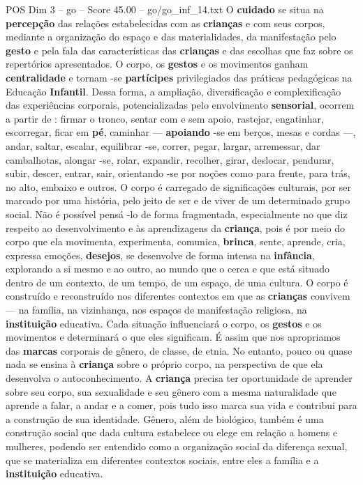 \begin{textsample}{POS Dim 3 – go – Score 45.00 – go/go\_inf\_14.txt}
O \textbf{cuidado} se situa na \textbf{percepção} das relações estabelecidas com as \textbf{crianças} e com seus corpos, mediante a organização do espaço e das materialidades, da manifestação pelo \textbf{gesto} e pela fala das características das \textbf{crianças} e das escolhas que faz sobre os repertórios apresentados.
O corpo, os \textbf{gestos} e os movimentos ganham \textbf{centralidade} e tornam -se \textbf{partícipes} privilegiados das práticas pedagógicas na Educação \textbf{Infantil}.
Dessa forma, a ampliação, diversificação e complexificação das experiências corporais, potencializadas pelo envolvimento \textbf{sensorial}, ocorrem a partir de : firmar o tronco, sentar com e sem apoio, rastejar, engatinhar, escorregar, ficar em \textbf{pé}, caminhar — \textbf{apoiando} -se em berços, mesas e cordas —, andar, saltar, escalar, equilibrar -se, correr, pegar, largar, arremessar, dar cambalhotas, alongar -se, rolar, expandir, recolher, girar, deslocar, pendurar, subir, descer, entrar, sair, orientando -se por noções como para frente, para trás, no alto, embaixo e outros.
O corpo é carregado de significações culturais, por ser marcado por uma história, pelo jeito de ser e de viver de um determinado grupo social.
Não é possível pensá -lo de forma fragmentada, especialmente no que diz respeito ao desenvolvimento e às aprendizagens da \textbf{criança}, pois é por meio do corpo que ela movimenta, experimenta, comunica, \textbf{brinca}, sente, aprende, cria, expressa emoções, \textbf{desejos}, se desenvolve de forma intensa na \textbf{infância}, explorando a si mesmo e ao outro, ao mundo que o cerca e que está situado dentro de um contexto, de um tempo, de um espaço, de uma cultura.
O corpo é construído e reconstruído nos diferentes contextos em que as \textbf{crianças} convivem — na família, na vizinhança, nos espaços de manifestação religiosa, na \textbf{instituição} educativa.
Cada situação influenciará o corpo, os \textbf{gestos} e os movimentos e determinará o que eles significam.
É assim que nos apropriamos das \textbf{marcas} corporais de gênero, de classe, de etnia.
No entanto, pouco ou quase nada se ensina à \textbf{criança} sobre o próprio corpo, na perspectiva de que ela desenvolva o autoconhecimento.
A \textbf{criança} precisa ter oportunidade de aprender sobre seu corpo, sua sexualidade e seu gênero com a mesma naturalidade que aprende a falar, a andar e a comer, pois tudo isso marca sua vida e contribui para a construção de sua identidade.
Gênero, além de biológico, também é uma construção social que dada cultura estabelece ou elege em relação a homens e mulheres, podendo ser entendido como a organização social da diferença sexual, que se materializa em diferentes contextos sociais, entre eles a família e a \textbf{instituição} educativa.

\end{textsample}
